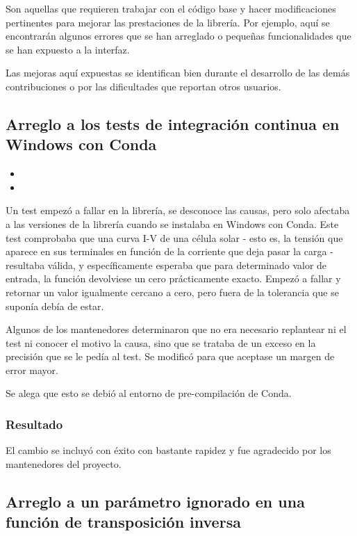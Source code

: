 Son aquellas que requieren trabajar con el código base y hacer modificaciones pertinentes para mejorar las prestaciones de la librería. Por ejemplo, aquí se encontrarán algunos errores que se han arreglado o pequeñas funcionalidades que se han expuesto a la interfaz.

Las mejoras aquí expuestas se identifican bien durante el desarrollo de las demás contribuciones o por las dificultades que reportan otros usuarios.

\subsection{Arreglo a los tests de integración continua en Windows con Conda}

\begin{itemize}
    \item {}
    \item {}
\end{itemize}

Un test empezó a fallar en la librería, se desconoce las causas, pero solo afectaba a las versiones de la librería cuando se instalaba en Windows con Conda. Este test comprobaba que una \gls{curva I-V} de una \gls{célula solar} - esto es, la tensión que aparece en sus terminales en función de la corriente que deja pasar la \gls{carga} - resultaba válida, y específicamente esperaba que para determinado valor de entrada, la función devolviese un cero prácticamente exacto. Empezó a fallar y retornar un valor igualmente cercano a cero, pero fuera de la tolerancia que se suponía debía de estar.

Algunos de los mantenedores determinaron que no era necesario replantear ni el test ni conocer el motivo la causa, sino que se trataba de un exceso en la precisión que se le pedía al test. Se modificó para que aceptase un margen de error mayor.

Se alega que esto se debió al entorno de pre-compilación de Conda.

\subsubsection{Resultado}

El cambio se incluyó con éxito con bastante rapidez y fue agradecido por los mantenedores del proyecto.

\subsection{Arreglo a un parámetro ignorado en una función de transposición inversa}

